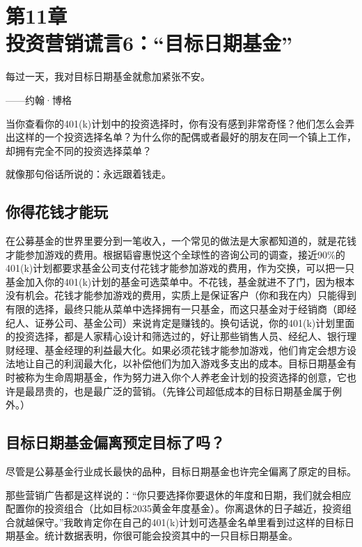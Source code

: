 
\section[第11章\q 投资营销谎言6：“目标日期基金”]{第11章\\ 投资营销谎言6：“目标日期基金”}

\begin{BookQuote}
每过一天，我对目标日期基金就愈加紧张不安。

\hfill ——约翰·博格
\end{BookQuote}

当你查看你的401(k)计划中的投资选择时，你有没有感到非常奇怪？他们怎么会弄出这样的一个投资选择名单？为什么你的配偶或者最好的朋友在同一个镇上工作，却拥有完全不同的投资选择菜单？

就像那句俗话所说的：永远跟着钱走。

\subsection{你得花钱才能玩}

在公募基金的世界里要分到一笔收入，一个常见的做法是大家都知道的，就是花钱才能参加游戏的费用。根据韬睿惠悦这个全球性的咨询公司的调查，接近90\%的401(k)计划都要求基金公司支付花钱才能参加游戏的费用，作为交换，可以把一只基金加入你的401(k)计划的基金可选菜单中。不花钱，基金就进不了门，因为根本没有机会。花钱才能参加游戏的费用，实质上是保证客户（你和我在内）只能得到有限的选择，最终只能从菜单中选择拥有一只基金，而这只基金对于经销商（即经纪人、证券公司、基金公司）来说肯定是赚钱的。换句话说，你的401(k)计划里面的投资选择，都是人家精心设计和筛选过的，好让那些销售人员、经纪人、银行理财经理、基金经理的利益最大化。如果必须花钱才能参加游戏，他们肯定会想方设法地让自己的利润最大化，以补偿他们为加入游戏多支出的成本。目标日期基金有时被称为生命周期基金，作为努力进入你个人养老金计划的投资选择的创意，它也许是最昂贵的，也是最广泛的营销。（先锋公司超低成本的目标日期基金属于例外。）

\subsection{目标日期基金偏离预定目标了吗？}

尽管是公募基金行业成长最快的品种，目标日期基金也许完全偏离了原定的目标。

那些营销广告都是这样说的：“你只要选择你要退休的年度和日期，我们就会相应配置你的投资组合（比如目标2035黄金年度基金）。你离退休的日子越近，投资组合就越保守。”我敢肯定你在自己的401(k)计划可选基金名单里看到过这样的目标日期基金。统计数据表明，你很可能会投资其中的一只目标日期基金。

